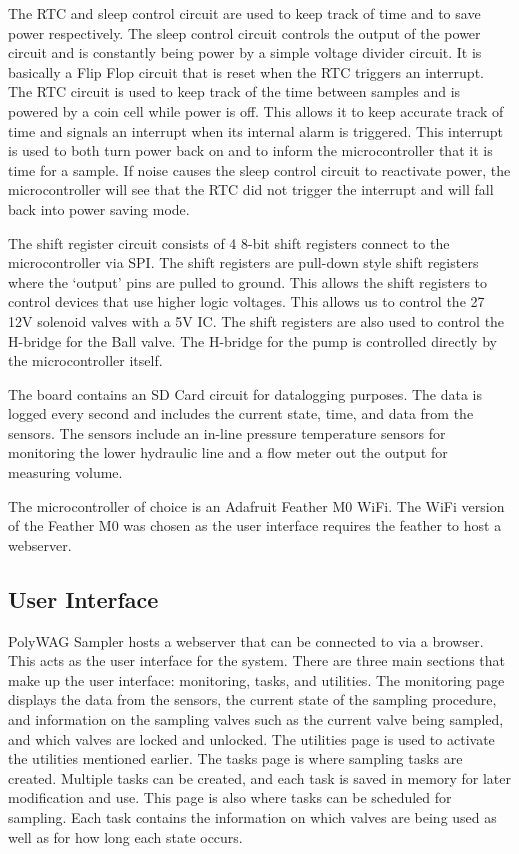 \documentclass[11pt, letterpaper]{article}
\begin{document}
The RTC and sleep control circuit are used to keep track of time and to save power respectively. The sleep control circuit controls the output of the power circuit and is constantly being power by a simple voltage divider circuit. It is basically a Flip Flop circuit that is reset when the RTC triggers an interrupt. The RTC circuit is used to keep track of the time between samples and is powered by a coin cell while power is off. This allows it to keep accurate track of time and signals an interrupt when its internal alarm is triggered. This interrupt is used to both turn power back on and to inform the microcontroller that it is time for a sample. If noise causes the sleep control circuit to reactivate power, the microcontroller will see that the RTC did not trigger the interrupt and will fall back into power saving mode. 

The shift register circuit consists of 4 8-bit shift registers connect to the microcontroller via SPI. The shift registers are pull-down style shift registers where the ‘output’ pins are pulled to ground. This allows the shift registers to control devices that use higher logic voltages. This allows us to control the 27 12V solenoid valves with a 5V IC. The shift registers are also used to control the H-bridge for the Ball valve. The H-bridge for the pump is controlled directly by the microcontroller itself. 

The board contains an SD Card circuit for datalogging purposes. The data is logged every second and includes the current state, time, and data from the sensors. The sensors include an in-line pressure temperature sensors for monitoring the lower hydraulic line and a flow meter out the output for measuring volume.

The microcontroller of choice is an Adafruit Feather M0 WiFi. The WiFi version of the Feather M0 was chosen as the user interface requires the feather to host a webserver. 


\subsection{User Interface}

PolyWAG Sampler hosts a webserver that can be connected to via a browser. This acts as the user interface for the system. There are three main sections that make up the user interface: monitoring, tasks, and utilities. The monitoring page displays the data from the sensors, the current state of the sampling procedure, and information on the sampling valves such as the current valve being sampled, and which valves are locked and unlocked. The utilities page is used to activate the utilities mentioned earlier. The tasks page is where sampling tasks are created. Multiple tasks can be created, and each task is saved in memory for later modification and use. This page is also where tasks can be scheduled for sampling. Each task contains the information on which valves are being used as well as for how long each state occurs. 
\end{document}
